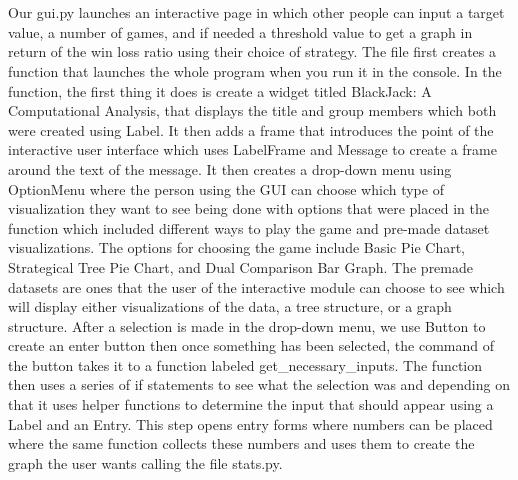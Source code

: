 \documentclass[fontsize=11pt]{article}
\begin{document}
\\\\
Our gui.py launches an interactive page in which other people can input a target value, a number of games, and if needed a threshold value to get a graph in return of the win loss ratio using their choice of strategy. The file first creates a function that launches the whole program when you run it in the console. In the function, the first thing it does is create a widget titled BlackJack: A Computational Analysis, that displays the title and group members which both were created using Label. It then adds a frame that introduces the point of the interactive user interface which uses LabelFrame and Message to create a frame around the text of the message. It then creates a drop-down menu using OptionMenu where the person using the GUI can choose which type of visualization they want to see being done with options that were placed in the function which included different ways to play the game and pre-made dataset visualizations. The options for choosing the game include Basic Pie Chart, Strategical Tree Pie Chart, and Dual Comparison Bar Graph. The premade datasets are ones that the user of the interactive module can choose to see which will display either visualizations of the data, a tree structure, or a graph structure. After a selection is made in the drop-down menu, we use Button to create an enter button then once something has been selected, the command of the button takes it to a function labeled get\_necessary\_inputs. The function then uses a series of if statements to see what the selection was and depending on that it uses helper functions to determine the input that should appear using a Label and an Entry. This step opens entry forms where numbers can be placed where the same function collects these numbers and uses them to create the graph the user wants calling the file stats.py.
\end{document}
